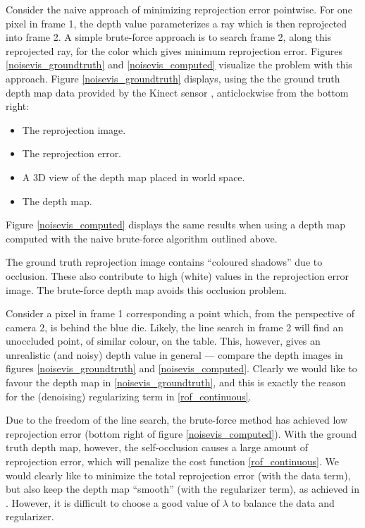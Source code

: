 \documentclass[conference]{IEEEtran}
\begin{document}
Consider the naive approach of minimizing reprojection error pointwise. For one pixel in frame 1, the depth value parameterizes a ray which
is then reprojected into frame 2. A simple brute-force approach is to search frame 2, along this reprojected ray, for the color which gives minimum
reprojection error.
Figures \ref{noisevis_groundtruth} and \ref{noisevis_computed} visualize the problem with this approach.
Figure \ref{noisevis_groundtruth} displays, using the the ground truth depth map data provided by the Kinect sensor \cite{tum_dataset}, anticlockwise
from the bottom right:
\begin{itemize}
    \item The reprojection image.
    \item The reprojection error.
    \item A 3D view of the depth map placed in world space.
    \item The depth map.
\end{itemize}
Figure \ref{noisevis_computed} displays the same results when using a depth map computed with the naive brute-force algorithm outlined above.

The ground truth reprojection image contains ``coloured shadows'' due to occlusion. These also contribute
to high (white) values in the reprojection error image. The brute-force depth map avoids this occlusion problem.

Consider a pixel in frame 1 corresponding a point which, from the perspective of camera 2, is behind the blue die.
Likely, the line search in frame 2 will find
an unoccluded point, of similar colour, on the table. This, however, gives an unrealistic (and noisy) depth value in general --- compare
the depth images in figures \ref{noisevis_groundtruth} and \ref{noisevis_computed}. Clearly we would like to favour the depth map in
\ref{noisevis_groundtruth}, and this is exactly the reason for the (denoising) regularizing term in \eqref{rof_continuous}.

Due to the freedom of the line search, the brute-force method has achieved low reprojection error (bottom right of figure \ref{noisevis_computed}).
With the ground truth depth map, however, the self-occlusion causes a large amount of reprojection error, which will penalize the cost function
\eqref{rof_continuous}. We would clearly like to minimize the total reprojection error (with the data term), but also keep the depth map ``smooth'' (with the regularizer term), as achieved in \cite{dense_geometry}.
However, it is difficult to choose a good value of $\lambda$ to balance the data and regularizer.
\end{document}
